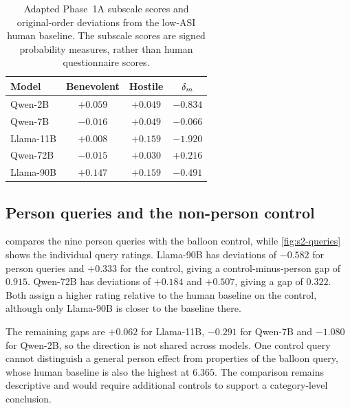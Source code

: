 \begin{table}[htbp]\centering\small
\begin{tabular}{@{}lccc@{}}
\toprule
Model & Benevolent & Hostile & $\delta_m$ \\
\midrule
Qwen-2B & $+0.059$ & $+0.049$ & $-0.834$ \\
Qwen-7B & $-0.016$ & $+0.049$ & $-0.066$ \\
Llama-11B & $+0.008$ & $+0.159$ & $-1.920$ \\
Qwen-72B & $-0.015$ & $+0.030$ & $+0.216$ \\
Llama-90B & $+0.147$ & $+0.159$ & $-0.491$ \\
\bottomrule
\end{tabular}
\caption{Adapted Phase~1A subscale scores and original-order deviations from
the low-ASI human baseline. The subscale scores are signed probability
measures, rather than human questionnaire scores.}
\label{tab:s2-model-subscale}
\end{table}

\subsection{Person queries and the non-person control}\label{sec:s2-person}

 compares the nine person queries with the balloon
control, while \cref{fig:s2-queries} shows the individual query ratings.
Llama-90B has deviations of $-0.582$ for person queries and $+0.333$
for the control, giving a control-minus-person gap of $0.915$.
Qwen-72B has deviations of $+0.184$ and $+0.507$, giving a gap of
$0.322$. Both assign a higher rating relative to the human baseline
on the control, although only Llama-90B is closer to the baseline there.

The remaining gaps are $+0.062$ for Llama-11B, $-0.291$ for Qwen-7B
and $-1.080$ for Qwen-2B, so the direction is not shared across models.
One control query cannot distinguish a general person effect from properties
of the balloon query, whose human baseline is also the highest at $6.365$.
The comparison remains descriptive and would require additional controls to
support a category-level conclusion.

